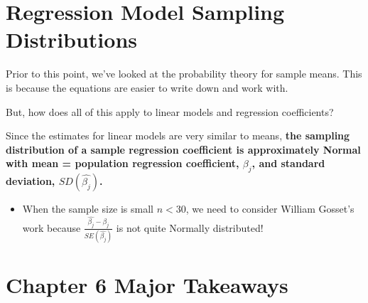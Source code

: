 \documentclass[
]{book}
\providecommand{\tightlist}{%
  \setlength{\itemsep}{0pt}\setlength{\parskip}{0pt}}
\begin{document}
\hypertarget{regression-model-sampling-distributions}{%
\section{Regression Model Sampling Distributions}\label{regression-model-sampling-distributions}}

Prior to this point, we've looked at the probability theory for sample means. This is because the equations are easier to write down and work with.

But, how does all of this apply to linear models and regression coefficients?

Since the estimates for linear models are very similar to means, \textbf{the sampling distribution of a sample regression coefficient is approximately Normal with mean = population regression coefficient, \(\beta_j\), and standard deviation, \(SD(\hat{\beta_j})\). }

\begin{itemize}
\tightlist
\item
  When the sample size is small \(n<30\), we need to consider William Gosset's work because \(\frac{\hat{\beta_j} - \beta_j}{SE(\hat{\beta_j})}\) is not quite Normally distributed!
\end{itemize}

\hypertarget{chapter-6-major-takeaways}{%
\section{Chapter 6 Major Takeaways}\label{chapter-6-major-takeaways}}
\end{document}
